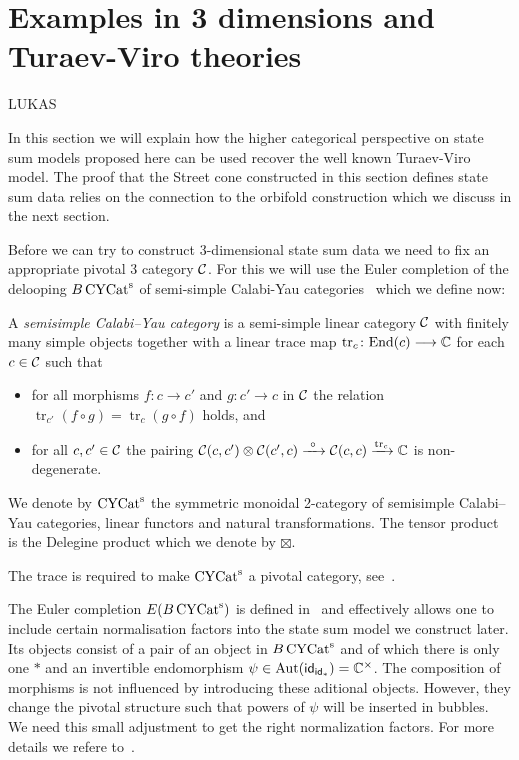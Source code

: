 
\section{Examples in 3 dimensions and Turaev-Viro theories}\label{sec:3D}

LUKAS

In this section we will explain how the higher categorical perspective on state sum models proposed here can be used recover the well known Turaev-Viro model. The proof that the Street cone constructed in this section defines state sum data relies on the connection to the orbifold construction which we discuss in the next section.

Before we can try to construct 3-dimensional state sum data we need to fix an appropriate pivotal 3 category $\mathcal{C}$. For this we will use the Euler completion of the delooping $B\operatorname{\mathrm{CYCat}^s}$ of semi-simple Calabi-Yau categories~\cite{3DOrb} which we define now:

\begin{definition}
	A \emph{semisimple Calabi--Yau category} is a semi-simple linear category $\mathcal{C}$ with finitely many simple objects together with a linear
	trace map $\operatorname{tr}_c \colon \mathrm{End} (c) \longrightarrow \mathbb{C}$ for each $c\in \mathcal{C}$ such that
	\begin{itemize}
		\item
		for all morphisms $f\colon c \longrightarrow c'$ and $g\colon c' \longrightarrow c$ in $\mathcal{C}$ the relation $\operatorname{tr}_{c'}(f\circ g)= \operatorname{tr}_c({g\circ f})$ holds, and
		\item
		for all $c,c'\in \mathcal{C}$ the pairing $\mathcal{C}(c,c') \otimes \mathcal{C}(c',c) \xrightarrow{\  \circ  \ } \mathcal{C}(c,c) \xrightarrow{\operatorname{tr}_c} \mathbb{C}$ is non-degenerate.
	\end{itemize}
We denote by $\operatorname{\mathrm{CYCat}^s}$ the symmetric monoidal 2-category of semisimple Calabi--Yau categories, linear functors and natural transformations. The tensor product is the Delegine product which we denote by $\boxtimes$. 
\end{definition}
The trace is required to make $\operatorname{\mathrm{CYCat}^s}$ a pivotal category, see~\cite[Proposition 5.6]{3DOrb}.  

The Euler completion $E(B\operatorname{\mathrm{CYCat}^s})$ is defined in~\cite[Section 5.1.3]{3DOrb} and effectively allows one to include certain normalisation factors into the state sum model we construct later. Its objects consist of a pair of an object in $B\operatorname{\mathrm{CYCat}^s}$ and of which there is only one $*$ and an invertible endomorphism $\psi \in \operatorname{Aut} (\mathsf{id}_{\mathsf{id}_*})=\mathbb{C}^\times$. The composition of morphisms is not influenced by introducing these aditional objects. However, they change the pivotal structure such that powers of $\psi$ will be inserted in bubbles. We need this small adjustment to get the right normalization factors. For more details we refere to~\cite[Section 5.1.3]{3DOrb}.  

